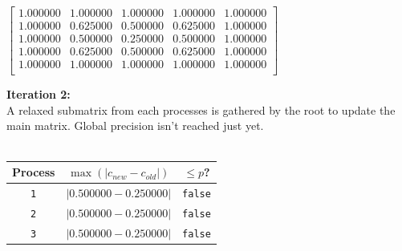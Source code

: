 \documentclass[11pt]{article}
\begin{document}
\hspace{-0.4cm}\begin{minipage}{0.47\textwidth}
$
\begin{bmatrix}
1.000000 & 1.000000 & 1.000000 & 1.000000 & 1.000000 \\
1.000000 & 0.625000 & 0.500000 & 0.625000 & 1.000000 \\
1.000000 & 0.500000 & 0.250000 & 0.500000 & 1.000000 \\
1.000000 & 0.625000 & 0.500000 & 0.625000 & 1.000000 \\
1.000000 & 1.000000 & 1.000000 & 1.000000 & 1.000000 \\
\end{bmatrix}
$
\end{minipage}\hspace{1.8cm}{\color{cyan!90}\vline}\hspace{0.5cm}
\begin{minipage}{.47\textwidth}\textbf{Iteration 2:}\\
A relaxed submatrix from each processes is gathered by the root to update the main matrix. Global precision isn't reached just yet.
\\
\\
\begin{tabular}{|c|c|c|}
\hline
\textbf{Process} & \textbf{$\max(|c_{new}-c_{old}|)$} & \textbf{$\leq p$?} \\
\hline
\texttt{1} & $|0.500000-0.250000|$ & {\color{red}\texttt{false}}\\
\texttt{2} & $|0.500000-0.250000|$ & {\color{red}\texttt{false}}\\
\texttt{3} & $|0.500000-0.250000|$ & {\color{red}\texttt{false}}\\
\hline
\end{tabular}
\end{minipage}
\end{document}
